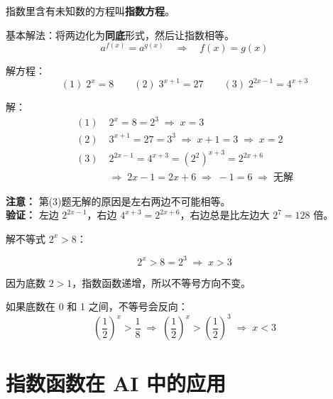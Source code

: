 \begin{definitionbox}[指数方程]
指数里含有未知数的方程叫\textbf{指数方程}。

基本解法：将两边化为\textbf{同底}形式，然后让指数相等。
\[
a^{f(x)} = a^{g(x)} \quad\Longrightarrow\quad f(x) = g(x)
\]
\end{definitionbox}

\begin{examplebox}[7——解指数方程]
解方程：
\[
(1)\; 2^x = 8 \qquad (2)\; 3^{x+1} = 27 \qquad (3)\; 2^{2x-1} = 4^{x+3}
\]

解：
\[
\begin{aligned}
(1)&\; 2^x = 8 = 2^3 \;\Longrightarrow\; x = 3 \\
(2)&\; 3^{x+1} = 27 = 3^3 \;\Longrightarrow\; x+1 = 3 \;\Longrightarrow\; x = 2 \\
(3)&\; 2^{2x-1} = 4^{x+3} = (2^2)^{x+3} = 2^{2x+6} \\
    &\;\Longrightarrow\; 2x-1 = 2x+6 \;\Longrightarrow\; -1 = 6 \;\Longrightarrow\; \text{无解}
\end{aligned}
\]

\textbf{注意：} 第(3)题无解的原因是左右两边不可能相等。\\
\textbf{验证：} 左边 \(2^{2x-1}\)，右边 \(4^{x+3} = 2^{2x+6}\)，右边总是比左边大 \(2^7 = 128\) 倍。
\end{examplebox}

\begin{examplebox}[8——指数不等式]
解不等式 \(2^x > 8\)：

\[
2^x > 8 = 2^3 \;\Longrightarrow\; x > 3
\]

因为底数 \(2 > 1\)，指数函数递增，所以不等号方向不变。

如果底数在 0 和 1 之间，不等号会反向：
\[
\left(\frac{1}{2}\right)^x > \frac{1}{8} \;\Longrightarrow\; \left(\frac{1}{2}\right)^x > \left(\frac{1}{2}\right)^3 \;\Longrightarrow\; x < 3
\]
\end{examplebox}


\section{指数函数在 AI 中的应用}

